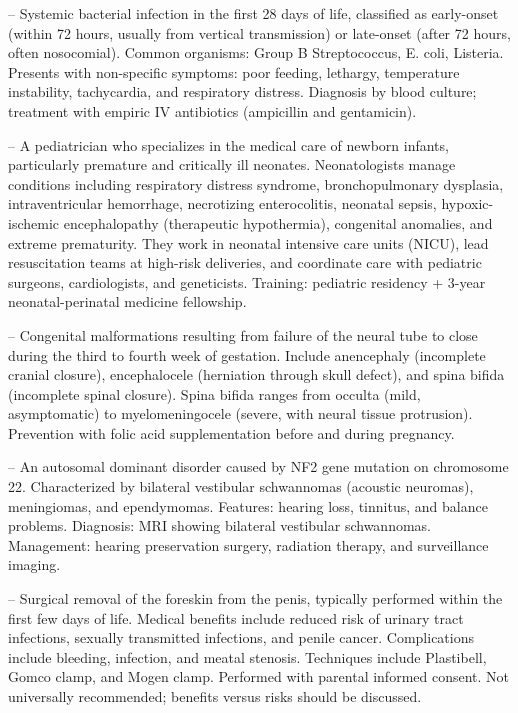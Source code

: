 -- Systemic bacterial infection in the first 28 days of life, classified as early-onset (within 72 hours, usually from vertical transmission) or late-onset (after 72 hours, often nosocomial). Common organisms: Group B Streptococcus, E. coli, Listeria. Presents with non-specific symptoms: poor feeding, lethargy, temperature instability, tachycardia, and respiratory distress. Diagnosis by blood culture; treatment with empiric IV antibiotics (ampicillin and gentamicin).

-- A pediatrician who specializes in the medical care of newborn infants, particularly premature and critically ill neonates. Neonatologists manage conditions including respiratory distress syndrome, bronchopulmonary dysplasia, intraventricular hemorrhage, necrotizing enterocolitis, neonatal sepsis, hypoxic-ischemic encephalopathy (therapeutic hypothermia), congenital anomalies, and extreme prematurity. They work in neonatal intensive care units (NICU), lead resuscitation teams at high-risk deliveries, and coordinate care with pediatric surgeons, cardiologists, and geneticists. Training: pediatric residency + 3-year neonatal-perinatal medicine fellowship.

-- Congenital malformations resulting from failure of the neural tube to close during the third to fourth week of gestation. Include anencephaly (incomplete cranial closure), encephalocele (herniation through skull defect), and spina bifida (incomplete spinal closure). Spina bifida ranges from occulta (mild, asymptomatic) to myelomeningocele (severe, with neural tissue protrusion). Prevention with folic acid supplementation before and during pregnancy.

-- An autosomal dominant disorder caused by NF2 gene mutation on chromosome 22. Characterized by bilateral vestibular schwannomas (acoustic neuromas), meningiomas, and ependymomas. Features: hearing loss, tinnitus, and balance problems. Diagnosis: MRI showing bilateral vestibular schwannomas. Management: hearing preservation surgery, radiation therapy, and surveillance imaging.

-- Surgical removal of the foreskin from the penis, typically performed within the first few days of life. Medical benefits include reduced risk of urinary tract infections, sexually transmitted infections, and penile cancer. Complications include bleeding, infection, and meatal stenosis. Techniques include Plastibell, Gomco clamp, and Mogen clamp. Performed with parental informed consent. Not universally recommended; benefits versus risks should be discussed.


